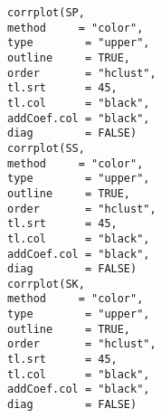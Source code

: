 \begin{verbatim}
corrplot(SP, 
method     = "color", 
type        = "upper", 
outline     = TRUE, 
order       = "hclust", 
tl.srt      = 45,
tl.col      = "black",
addCoef.col = "black", 
diag        = FALSE)
corrplot(SS, 
method     = "color", 
type        = "upper", 
outline     = TRUE, 
order       = "hclust", 
tl.srt      = 45,
tl.col      = "black",
addCoef.col = "black", 
diag        = FALSE)
corrplot(SK, 
method     = "color", 
type        = "upper", 
outline     = TRUE, 
order       = "hclust", 
tl.srt      = 45,
tl.col      = "black",
addCoef.col = "black", 
diag        = FALSE)

\end{verbatim}